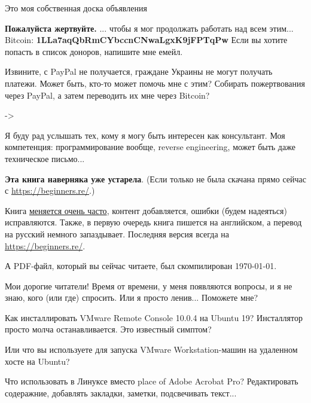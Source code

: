 
\begin{center}
\LARGE{} Это моя собственная доска объявления \normalsize{}
\end{center}

\textbf{Пожалуйста жертвуйте.}
... чтобы я мог продолжать работать над всем этим...\\
Bitcoin: \textbf{1LLa7aqQbRmCYbccnCNwaLgxK9jFPTqPw}
Если вы хотите попасть в список доноров, напишите мне емейл.

Извините, с PayPal не получается, граждане Украины не могут получать платежи.
Может быть, кто-то может помочь мне с этим?
Собирать пожертвования через PayPal, а затем переводить их мне через Bitcoin?

-> \EMAIL{}

\myhrule{}

Я буду рад услышать тех, кому я могу быть интересен как консультант.
Моя компетенция: программирование вообще, reverse engineering, может быть даже техническое письмо...

\myhrule{}

\textbf{Эта книга наверняка уже устарела}.
(Если только не была скачана прямо сейчас с \url{https://beginners.re/}.)

Книга \href{https://github.com/DennisYurichev/RE-for-beginners/commits/master}{меняется очень часто},
контент добавляется, ошибки (будем надеяться) исправляются.
Также, в первую очередь книга пишется на английском, а перевод на русский немного запаздывает.
Последняя версия всегда на \url{https://beginners.re/}.

А PDF-файл, который вы сейчас читаете, был скомпилирован \today{}.

\myhrule{}

Мои дорогие читатели! Время от времени, у меня появляются вопросы, и я не знаю, кого (или где) спросить.
Или я просто ленив...
Поможете мне?

\myhrule{}

Как инсталлировать VMware Remote Console 10.0.4 на Ubuntu 19? Инсталлятор просто молча останавливается. Это известный симптом?

Или что вы используете для запуска VMware Workstation-машин на удаленном хосте на Ubuntu?

\myhrule{}

Что использовать в Линуксе вместо place of Adobe Acrobat Pro?
Редактировать содеражние, добавлять закладки, заметки, подсвечивать текст...


